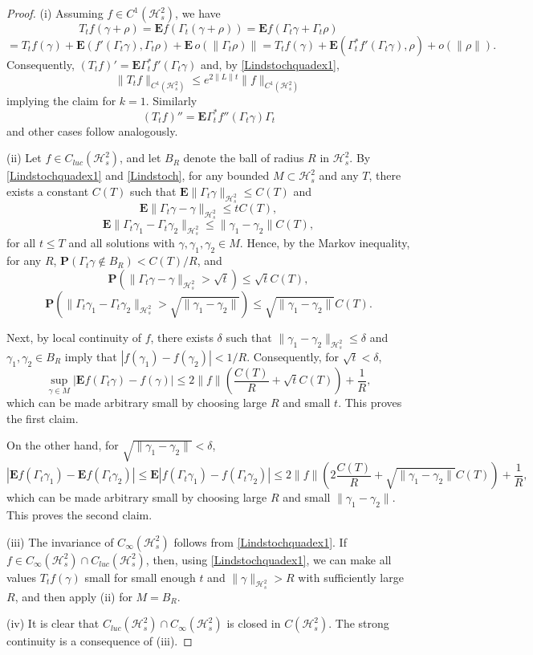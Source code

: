 \documentclass[10pt,a4paper]{amsart}
\def\HC{\mathcal{H}}
\def\E{\mathbf{E}}
\def\P{\mathbf{P}}
\def\de{\delta}
\def\ga{\gamma}
\newcommand{\Ga}{\Gamma}
\begin{document}
\begin{proof}
(i) Assuming $f\in C^1(\HC^2_s)$, we have
\[
T_tf(\ga+\rho)=\E f(\Ga_t(\ga+\rho))=\E f(\Ga_t \ga+\Ga_t\rho)
\]
\[
=T_tf(\ga)+ \E (f'(\Ga_t\ga), \Ga_t \rho)+\E \, o(\|\Ga_t\rho)\|
=T_t f(\ga)+\E (\Ga_t^* f'(\Ga_t \ga), \rho)+o(\|\rho\|).
\]
Consequently, $(T_tf)'=\E \Ga_t^* f'(\Ga_t\ga)$ and,
by \eqref{Lindstochquadex1},
\[
\|T_tf\|_{C^1(\HC^2_s)}\le e^{2\|L\|t} \|f\|_{C^1(\HC^2_s)}
\]
implying the claim for $k=1$.
Similarly
\begin{equation}
\label{eqLinsdesem}
(T_tf)''=\E \Ga_t^* f''(\Ga_t\ga) \Ga_t
\end{equation}
and other cases follow analogously.

(ii) Let  $f\in C_{luc}(\HC^2_s)$, and let $B_R$ denote the ball of radius $R$ in $\HC^2_s$.
By \eqref{Lindstochquadex1} and \eqref{Lindstoch}, for any bounded $M\subset \HC^2_s$ and any $T$,
there exists a constant $C(T)$ such that $\E \|\Ga_t \ga \|_{\HC^2_s}\le C(T)$ and
\[
\E \|\Ga_t\ga-\ga\|_{\HC^2_s}\le t C(T),
\]
\[
\E \|\Ga_t\ga_1-\Ga_t \ga_2\|_{\HC^2_s}\le \|\ga_1-\ga_2\| C(T),
\]
for all $t\le T$ and all solutions with $\ga,\ga_1,\ga_2 \in M$.
Hence, by the Markov inequality, for any $R$,
 $\P (\Ga_t\ga \notin B_R)<C(T)/R$, and
\[
\P (\|\Ga_t\ga-\ga\|_{\HC^2_s}>\sqrt t) \le \sqrt t C(T),
\]
\[
\P (\|\Ga_t\ga_1-\Ga_t\ga_2\|_{\HC^2_s}>\sqrt{\|\ga_1-\ga_2\|}) \le \sqrt {\|\ga_1-\ga_2\|}  C(T).
\]

Next, by local continuity of $f$, there exists $\de$ such that
$\|\ga_1-\ga_2\|_{\HC^2_s}\le\de $ and $\ga_1,\ga_2\in B_R$ imply
that $|f(\ga_1)-f(\ga_2)|<1/R$. Consequently, for $\sqrt t <\de$,
\[
\sup_{\ga\in M} |\E f(\Ga_t \ga)-f(\ga)|
\le 2\|f\| (\frac{C(T)}{R}+\sqrt t C(T)) +\frac{1}{R},
\]
which can be made arbitrary small by choosing large $R$ and small $t$. This proves the first claim.

On the other hand, for $\sqrt{\|\ga_1-\ga_2\|}<\de$,
\[
|\E f(\Ga_t \ga_1)-\E f(\Ga_t \ga_2)|\le  \E |f(\Ga_t \ga_1)-f(\Ga_t \ga_2)|
\le 2\|f\| (2 \frac{C(T)}{R}+\sqrt {\|\ga_1-\ga_2\|}  C(T)) +\frac{1}{R},
\]
which can be made arbitrary small by choosing large $R$ and small $\|\ga_1-\ga_2\|$. This proves the second claim.

(iii) The invariance of $ C_{\infty}(\HC^2_s)$ follows from \eqref{Lindstochquadex1}.
If $f\in C_{\infty}(\HC^2_s)\cap C_{luc}(\HC^2_s)$, then, using \eqref{Lindstochquadex1},
we can make all values $T_tf(\ga)$ small for small enough $t$ and $\|\ga\|_{\HC^2_s}>R$
with sufficiently large $R$, and then apply (ii) for $M=B_R$.

(iv) It is clear that $C_{luc}(\HC^2_s)\cap C_{\infty}(\HC^2_s)$
is closed in $C(\HC^2_s)$. The strong continuity is a consequence of (iii).
\end{proof}
\end{document}
